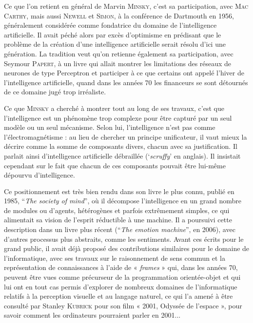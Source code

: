 Ce que l’on retient en général de Marvin \textsc{Minsky}, c’est sa participation, avec \textsc{Mac Carthy}, mais aussi \textsc{Newell} et \textsc{Simon}, à la conférence de Dartmouth en 1956, généralement considérée comme fondatrice du domaine de l’intelligence artificielle. Il avait péché alors par excès d’optimisme en prédisant que le problème de la création d’une intelligence artificielle serait résolu d’ici une génération. La tradition veut qu’on retienne également sa participation, avec Seymour \textsc{Papert}, à un livre qui allait montrer les limitations des réseaux de neurones de type Perceptron et participer à ce que certains ont appelé l’hiver de l’intelligence artificielle, quand dans les années 70 les financeurs se sont détournés de ce domaine jugé trop irréaliste.

Ce que \textsc{Minsky} a cherché à montrer tout au long de ses travaux, c’est que l’intelligence est un phénomène trop complexe pour être capturé par un seul modèle ou un seul mécanisme. Selon lui, l’intelligence n’est pas comme l’électromagnétisme : au lieu de chercher un principe unificateur, il vaut mieux la décrire comme la somme de composants divers, chacun avec sa justification. Il parlait ainsi d’intelligence artificielle débraillée (‘\textit{scruffy}’ en anglais). Il insistait cependant sur le fait que chacun de ces composants pouvait être lui-même dépourvu d’intelligence.

Ce positionnement est très bien rendu dans son livre le plus connu, publié en 1985, “\textit{The society of mind}”, où il décompose l’intelligence en un grand nombre de modules ou d’agents, hétérogènes et parfois extrêmement simples, ce qui alimentait sa vision de l’esprit réductible à une machine. Il a poursuivi cette description dans un livre plus récent (“\textit{The emotion machine}”, en 2006), avec d’autres processus plus abstraits, comme les sentiments. Avant ces écrits pour le grand public, il avait déjà proposé des contributions similaires pour le domaine de l’informatique, avec ses travaux sur le raisonnement de sens commun et la représentation de connaissances à l’aide de « \textit{frames} » qui, dans les années 70, peuvent être vues comme précurseur de la programmation orientée-objet et qui lui ont en tout cas permis d’explorer de nombreux domaines de l’informatique relatifs à la perception visuelle et au langage naturel, ce qui l’a amené à être consulté par Stanley \textsc{Kubrick} pour son film « 2001, Odyssée de l’espace », pour savoir comment les ordinateurs pourraient parler en 2001...

